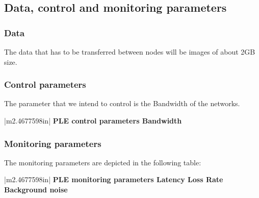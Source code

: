 \documentclass[a4paper]{article}
\makeatletter
\newcommand\arraybslash{\let\\\@arraycr}
\makeatother
\begin{document}
\bigskip

\subsection[Data, control and monitoring parameters]{Data, control and
monitoring parameters}
\hypertarget{Toc381777252}{}
\bigskip

\subsubsection[Data]{Data}
\hypertarget{Toc381777253}{}The data that has to be transferred between
nodes will be images of about 2GB size.


\bigskip

\subsubsection[Control parameters]{Control parameters}
\hypertarget{Toc381777254}{}
\bigskip

The parameter that we intend to control is the Bandwidth of the
networks.


\bigskip

\begin{center}
\tablehead{}
\begin{supertabular}{|m{2.4677598in}|}
\hline
\centering\arraybslash \bfseries PLE control parameters\\\hline
\centering\arraybslash Bandwidth\\\hline
\end{supertabular}
\end{center}

\bigskip


\bigskip

\subsubsection[Monitoring parameters]{Monitoring parameters}
\hypertarget{Toc381777255}{}
\bigskip

The monitoring parameters are depicted in the following table:


\bigskip

\begin{center}
\tablehead{}
\begin{supertabular}{|m{2.4677598in}|}
\hline
\centering\arraybslash \bfseries PLE monitoring parameters\\\hline
\centering\arraybslash Latency\\\hline
\centering\arraybslash Loss Rate\\\hline
\centering\arraybslash Background noise\\\hline
\end{supertabular}
\end{center}
\end{document}
